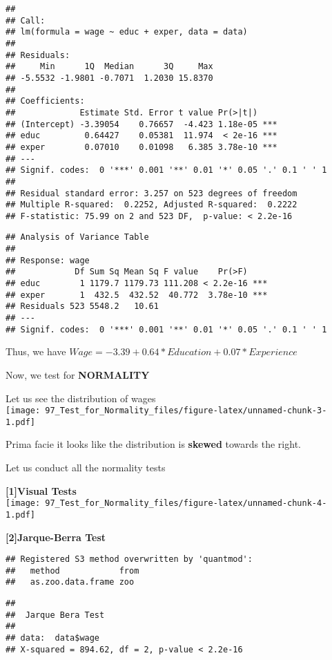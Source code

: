 \documentclass[
]{article}
\begin{document}
\begin{verbatim}
## 
## Call:
## lm(formula = wage ~ educ + exper, data = data)
## 
## Residuals:
##     Min      1Q  Median      3Q     Max 
## -5.5532 -1.9801 -0.7071  1.2030 15.8370 
## 
## Coefficients:
##             Estimate Std. Error t value Pr(>|t|)    
## (Intercept) -3.39054    0.76657  -4.423 1.18e-05 ***
## educ         0.64427    0.05381  11.974  < 2e-16 ***
## exper        0.07010    0.01098   6.385 3.78e-10 ***
## ---
## Signif. codes:  0 '***' 0.001 '**' 0.01 '*' 0.05 '.' 0.1 ' ' 1
## 
## Residual standard error: 3.257 on 523 degrees of freedom
## Multiple R-squared:  0.2252, Adjusted R-squared:  0.2222 
## F-statistic: 75.99 on 2 and 523 DF,  p-value: < 2.2e-16
\end{verbatim}

\begin{verbatim}
## Analysis of Variance Table
## 
## Response: wage
##            Df Sum Sq Mean Sq F value    Pr(>F)    
## educ        1 1179.7 1179.73 111.208 < 2.2e-16 ***
## exper       1  432.5  432.52  40.772  3.78e-10 ***
## Residuals 523 5548.2   10.61                      
## ---
## Signif. codes:  0 '***' 0.001 '**' 0.01 '*' 0.05 '.' 0.1 ' ' 1
\end{verbatim}

Thus, we have \(Wage=-3.39+0.64*Education +0.07*Experience\)

Now, we test for \textbf{NORMALITY}

Let us see the distribution of wages\\
\texttt{[image: 97\_Test\_for\_Normality\_files/figure-latex/unnamed-chunk-3-1.pdf]}

Prima facie it looks like the distribution is \textbf{skewed} towards
the right.

Let us conduct all the normality tests

\textbf{{[}1{]}Visual Tests}\\
\texttt{[image: 97\_Test\_for\_Normality\_files/figure-latex/unnamed-chunk-4-1.pdf]}

\textbf{{[}2{]}Jarque-Berra Test}

\begin{verbatim}
## Registered S3 method overwritten by 'quantmod':
##   method            from
##   as.zoo.data.frame zoo
\end{verbatim}

\begin{verbatim}
## 
##  Jarque Bera Test
## 
## data:  data$wage
## X-squared = 894.62, df = 2, p-value < 2.2e-16
\end{verbatim}
\end{document}
